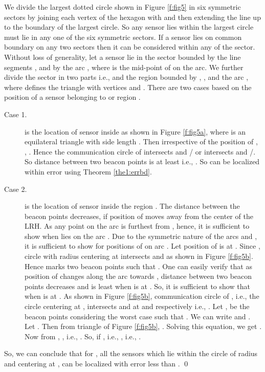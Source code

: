 \documentclass[preprint,11pt]{elsarticle}
\newenvironment{proof}{\noindent{\bf Proof: }}{\qed \smallbreak}
\begin{document}
\begin{proof}
We divide the largest dotted circle shown in Figure \ref{f:fig5} in six symmetric sectors by
joining each vertex of the hexagon with  and then extending the line up to the boundary of the largest circle.
So any sensor lies within the largest circle must lie in any one of the six symmetric sectors. If a sensor lies
on common boundary on any two sectors then it can be considered within any of the sector.
Without loss of generality, let a sensor lie in the sector bounded by the line segments ,  and
by the arc , where  is the mid-point of  on the arc. We further divide the sector in two parts i.e.,  and the region  bounded by , ,  and the arc , where  defines the triangle with vertices  and . There are two cases based on the position of a sensor belonging to  or region .
\begin{description}
  \item[Case 1.]  is the location of sensor inside  as shown in Figure \ref{f:fig5a}, where  is an equilateral triangle with side length . Then irrespective of the position of , , . Hence the communication circle of  intersects  and / or intersects  and /. So distance  between two beacon points is at least  i.e., . So  can be localized within  error using Theorem \ref{the1:errbd}.
  \item[Case 2.]  is the location of sensor inside the region . The distance  between the beacon points decreases, if position of  moves away from the center  of the LRH. As any point on the arc  is furthest from , hence, it is sufficient to show  when  lies on the arc . Due to the symmetric nature of the arcs  and , it is sufficient to show for positions of  on arc . Let position of  is at . Since , circle with radius  centering at  intersects  and  as shown in Figure \ref{f:fig5b}. Hence  marks two beacon points such that .
      One can easily verify that as position of  changes along the arc  towards , distance  between two beacon points decreases and  is least when  is at . So, it is sufficient to show that  when  is at .
      As shown in Figure \ref{f:fig5b}, communication circle of , i.e., the circle centering at , intersects  and  at  and  respectively i.e., . Let ,  be the beacon points considering the worst case such that .
      We can write  and . Let . Then from triangle  of Figure \ref{f:fig5b},
      . Solving this equation, we get . Now from  ,
      , i.e., . So,  if , i.e., , i.e., .
\end{description}
So, we can conclude that for , all the sensors which lie within the circle of radius  and centering at , can be localized with error less than .
\end{proof}
\end{document}
